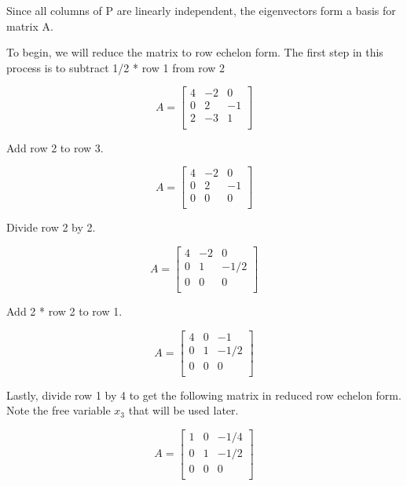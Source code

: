 \documentclass[11pt,addpoints]{exam}
\begin{document}
\begin{questions}
Since all columns of P are linearly independent, the eigenvectors form a basis for matrix A.



To begin, we will reduce the matrix to row echelon form. The first step in this process is to subtract 1/2 * row 1 from row 2

\[
A = \begin{bmatrix}
4 & -2 & 0 \\
0 & 2 & -1 \\
2 & -3 & 1 \\
\end{bmatrix}
\]

Add row 2 to row 3.

\[
A = \begin{bmatrix}
4 & -2 & 0 \\
0 & 2 & -1 \\
0 & 0 & 0 \\
\end{bmatrix}
\]

Divide row 2 by 2.

\[
A = \begin{bmatrix}
4 & -2 & 0 \\
0 & 1 & -1/2 \\
0 & 0 & 0 \\
\end{bmatrix}
\]

Add 2 * row 2 to row 1.

\[
A = \begin{bmatrix}
4 & 0 & -1 \\
0 & 1 & -1/2 \\
0 & 0 & 0 \\
\end{bmatrix}
\]

Lastly, divide row 1 by 4 to get the following matrix in reduced row echelon form. Note the free variable $x_3$ that will be used later.

\[
A = \begin{bmatrix}
1 & 0 & -1/4 \\
0 & 1 & -1/2 \\
0 & 0 & 0 \\
\end{bmatrix}
\]


\end{questions}
\end{document}
